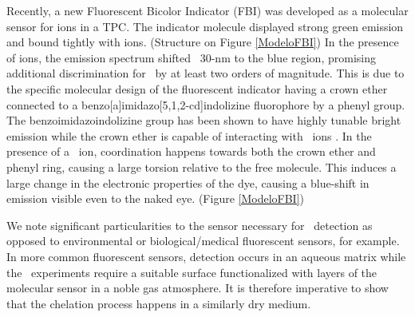 \documentclass[aps,prl,reprint,longbibliography,superscriptaddress, english]{revtex4-1}
\newcommand{\completar}[1]{{\color{red} #1}}
\begin{document}
Recently, a new Fluorescent Bicolor Indicator (FBI) was developed as a molecular sensor for \Bapp ions in a TPC.\cite{rivilla_fluorescent_2020} The indicator molecule displayed strong green emission and bound tightly with \Bapp ions. (Structure on Figure \ref{ModeloFBI}) In the presence of \Bapp ions, the emission spectrum shifted ~30-nm to the blue region, promising additional discrimination for \bbonu\ by at least two orders of magnitude. This is due to the specific molecular design of the fluorescent indicator having a crown ether connected to a benzo[a]imidazo[5,1,2-cd]indolizine fluorophore by a phenyl group. The benzoimidazoindolizine group has been shown to have highly tunable bright emission\cite{Stasyuk_benzo,Levesque_general} while the crown ether is capable of interacting with \Bapp\ ions \cite{valeur_chemical,maleknia_cavity-size-dependent_2002}. In the presence of a \Bapp\ ion, coordination happens towards both the crown ether and phenyl ring, causing a large torsion relative to the free molecule. This induces a large change in the electronic properties of the dye, causing a blue-shift in emission visible even to the naked eye. (Figure \ref{ModeloFBI})

We note significant particularities to the sensor necessary for \bbonu\ detection as opposed to environmental or biological/medical fluorescent sensors\cite{D1CP01203G}, for example. In more common fluorescent sensors, detection occurs in an aqueous matrix while the \bbonu\ experiments require a suitable surface functionalized with layers of the molecular sensor in a noble gas atmosphere. It is therefore imperative to show that the chelation process happens in a similarly dry medium.



 
\end{document}
